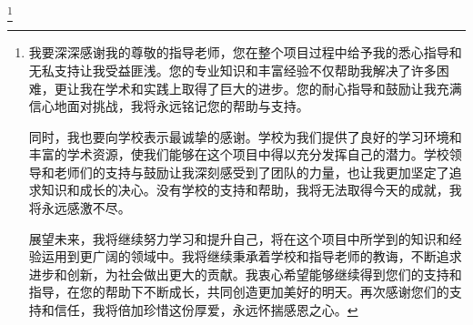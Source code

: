 {}
\thanks{
我要深深感谢我的尊敬的指导老师，您在整个项目过程中给予我的悉心指导和无私支持让我受益匪浅。您的专业知识和丰富经验不仅帮助我解决了许多困难，更让我在学术和实践上取得了巨大的进步。您的耐心指导和鼓励让我充满信心地面对挑战，我将永远铭记您的帮助与支持。

同时，我也要向学校表示最诚挚的感谢。学校为我们提供了良好的学习环境和丰富的学术资源，使我们能够在这个项目中得以充分发挥自己的潜力。学校领导和老师们的支持与鼓励让我深刻感受到了团队的力量，也让我更加坚定了追求知识和成长的决心。没有学校的支持和帮助，我将无法取得今天的成就，我将永远感激不尽。


展望未来，我将继续努力学习和提升自己，将在这个项目中所学到的知识和经验运用到更广阔的领域中。我将继续秉承着学校和指导老师的教诲，不断追求进步和创新，为社会做出更大的贡献。我衷心希望能够继续得到您们的支持和指导，在您的帮助下不断成长，共同创造更加美好的明天。再次感谢您们的支持和信任，我将倍加珍惜这份厚爱，永远怀揣感恩之心。}